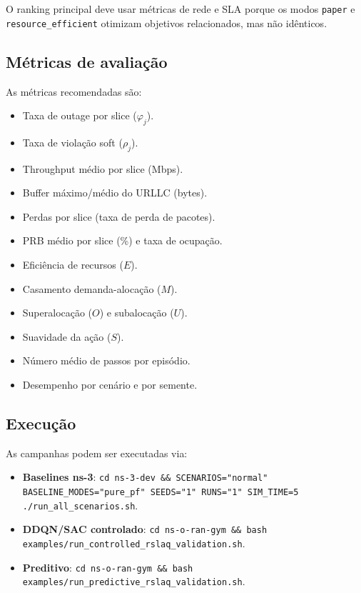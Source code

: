 \documentclass[10pt,a4paper]{IEEEtran}
\begin{document}
O ranking principal deve usar m\'{e}tricas de rede e SLA
porque os modos \texttt{paper} e \texttt{resource\_efficient}
otimizam objetivos relacionados, mas n\~{a}o id\^{e}nticos.

\subsection{M\'{e}tricas de avalia\c{c}\~{a}o}

As m\'{e}tricas recomendadas s\~{a}o:

\begin{itemize}
\item Taxa de outage por slice ($\varphi_j$).
\item Taxa de viola\c{c}\~{a}o soft ($\rho_j$).
\item Throughput m\'{e}dio por slice (Mbps).
\item Buffer m\'{a}ximo/m\'{e}dio do URLLC (bytes).
\item Perdas por slice (taxa de perda de pacotes).
\item PRB m\'{e}dio por slice (\%) e taxa de ocupa\c{c}\~{a}o.
\item Efici\^{e}ncia de recursos ($E$).
\item Casamento demanda-aloca\c{c}\~{a}o ($M$).
\item Superaloca\c{c}\~{a}o ($O$) e subaloca\c{c}\~{a}o ($U$).
\item Suavidade da a\c{c}\~{a}o ($S$).
\item N\'{u}mero m\'{e}dio de passos por epis\'{o}dio.
\item Desempenho por cen\'{a}rio e por semente.
\end{itemize}

\subsection{Execu\c{c}\~{a}o}

As campanhas podem ser executadas via:

\begin{itemize}
\item \textbf{Baselines ns-3}: \texttt{cd ns-3-dev \&\& SCENARIOS="normal" BASELINE\_MODES="pure\_pf" SEEDS="1" RUNS="1" SIM\_TIME=5 ./run\_all\_scenarios.sh}.
\item \textbf{DDQN/SAC controlado}: \texttt{cd ns-o-ran-gym \&\& bash examples/run\_controlled\_rslaq\_validation.sh}.
\item \textbf{Preditivo}: \texttt{cd ns-o-ran-gym \&\& bash examples/run\_predictive\_rslaq\_validation.sh}.
\end{itemize}
\end{document}
